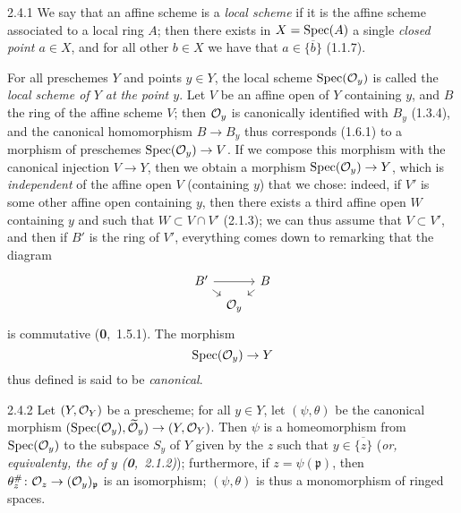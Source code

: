 \documentclass[../main.tex]{subfiles}
\begin{document}
    \begin{cx}{2.4.1}
        We say that an affine scheme is a \emph{local scheme} if it is the affine scheme associated to a local ring $A$; then there exists in $X=\operatorname*{Spec}(A)$ a single \emph{closed point $a\in X$}, and for all other $b\in X$ we have that $a\in\overline{\{b\}}$ (1.1.7).
    \end{cx}
    
    For all preschemes $Y$ and points $y\in Y$, the local scheme $\operatorname*{Spec}(\mathcal{O}_y)$ is called the \emph{local scheme of $Y$ at the point $y$}.
    Let $V$ be an affine open of $Y$ containing $y$, and $B$ the ring of the affine scheme $V$; then $\mathcal{O}_y$ is canonically identified with $B_y$ (1.3.4), and the canonical homomorphism $B\to B_y$ thus corresponds (1.6.1) to a morphism of preschemes $\operatorname*{Spec}(\mathcal{O}_y)\to V$.
    If we compose this morphism with the canonical injection $V\to Y$, then we obtain a morphism $\operatorname*{Spec}(\mathcal{O}_y)\to Y$, which is \emph{independent} of the affine open $V$ (containing $y$) that we chose: indeed, if $V'$ is some other affine open containing $y$, then there exists a third affine open $W$ containing $y$ and such that $W\subset V\cap V'$ (2.1.3); we can thus assume that $V\subset V'$, and then if $B'$ is the ring of $V'$, everything comes down to remarking that the diagram
    \begin{equation*}
        \begin{tikzcd}[column sep=tiny, row sep=tiny]
            B'\arrow[rr]\arrow[dr]&&B\arrow[dl]\\
            &\O_y&
        \end{tikzcd}
    \end{equation*}
    is commutative (\textbf{0},~1.5.1).
    The morphism
    \begin{equation*}
        \operatorname*{Spec}(\mathcal{O}_y)\to Y
    \end{equation*}
    thus defined is said to be \emph{canonical}.
    
    \begin{cx}[Proposition]{2.4.2}
        Let $(Y,\mathcal{O}_Y)$ be a prescheme; for all $y\in Y$, let $(\psi,\theta)$ be the canonical morphism $(\operatorname*{Spec}(\mathcal{O}_y),\widetilde{\mathcal{O}}_y)\to(Y,\mathcal{O}_Y)$.
        Then $\psi$ is a homeomorphism from $\operatorname*{Spec}(\mathcal{O}_y)$ to the subspace $S_y$ of $Y$ given by the $z$ such that $y\in\overline{\{z\}}$ (\emph{or, equivalenty, the \emph{} of $y$ (\textbf{0},~2.1.2)}); furthermore, if $z=\psi(\mathfrak{p})$, then $\theta_z^\#\colon\mathcal{O}_z\to(\mathcal{O}_y)_\mathfrak{p}$ is an isomorphism; $(\psi,\theta)$ is thus a monomorphism of ringed spaces.
    \end{cx}
    
\end{document}
